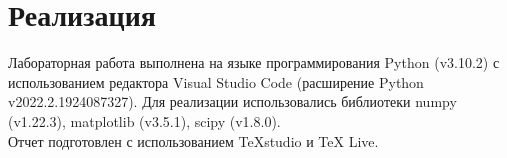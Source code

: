 \section{Реализация}
\begin{flushleft}
	Лабораторная работа выполнена на языке программирования Python (v3.10.2) с использованием редактора Visual Studio Code (расширение Python v2022.2.1924087327).
	Для реализации использовались библиотеки numpy (v1.22.3), matplotlib (v3.5.1), scipy (v1.8.0). \\
	Отчет подготовлен с использованием TeXstudio и TeX Live.
\end{flushleft}